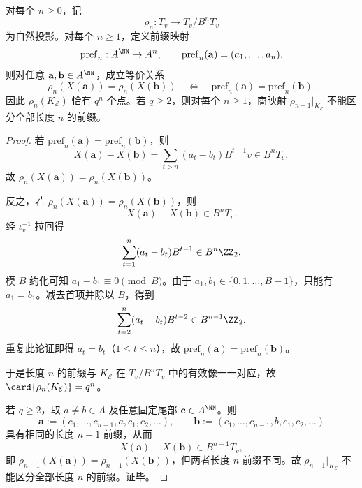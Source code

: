 \begin{proposition}\label{prop:killo-2adic-holographic-prefix-classification}
对每个 \(n\ge 0\)，记
\[
\rho_n:T_v\to T_v/B^nT_v
\]
为自然投影。对每个 \(n\ge 1\)，定义前缀映射
\[
\mathrm{pref}_n:A^\NN\to A^n,\qquad
\mathrm{pref}_n(\mathbf a)=(a_1,\dots,a_n),
\]
则对任意 \(\mathbf a,\mathbf b\in A^\NN\)，成立等价关系
\[
\rho_n(X(\mathbf a))=\rho_n(X(\mathbf b))
\quad\Longleftrightarrow\quad
\mathrm{pref}_n(\mathbf a)=\mathrm{pref}_n(\mathbf b).
\]
因此 \(\rho_n(K_{\mathcal E})\) 恰有 \(q^n\) 个点。若 \(q\ge 2\)，则对每个 \(n\ge 1\)，商映射 \(\rho_{n-1}|_{K_{\mathcal E}}\) 不能区分全部长度 \(n\) 的前缀。
\end{proposition}
\begin{proof}
若 \(\mathrm{pref}_n(\mathbf a)=\mathrm{pref}_n(\mathbf b)\)，则
\[
X(\mathbf a)-X(\mathbf b)=\sum_{t>n}(a_t-b_t)B^{t-1}v\in B^nT_v,
\]
故 \(\rho_n(X(\mathbf a))=\rho_n(X(\mathbf b))\)。

反之，若 \(\rho_n(X(\mathbf a))=\rho_n(X(\mathbf b))\)，则
\[
X(\mathbf a)-X(\mathbf b)\in B^nT_v.
\]
经 \(\iota_v^{-1}\) 拉回得
\[
\sum_{t=1}^{n}(a_t-b_t)B^{t-1}\in B^n\ZZ_2.
\]
模 \(B\) 约化可知 \(a_1-b_1\equiv 0\pmod B\)。由于 \(a_1,b_1\in\{0,1,\dots,B-1\}\)，只能有 \(a_1=b_1\)。减去首项并除以 \(B\)，得到
\[
\sum_{t=2}^{n}(a_t-b_t)B^{t-2}\in B^{n-1}\ZZ_2.
\]
重复此论证即得 \(a_t=b_t\)（\(1\le t\le n\)），故 \(\mathrm{pref}_n(\mathbf a)=\mathrm{pref}_n(\mathbf b)\)。

于是长度 \(n\) 的前缀与 \(K_{\mathcal E}\) 在 \(T_v/B^nT_v\) 中的有效像一一对应，故 \(\card{\rho_n(K_{\mathcal E})}=q^n\)。

若 \(q\ge 2\)，取 \(a\neq b\in A\) 及任意固定尾部 \(\mathbf c\in A^\NN\)。则
\[
\mathbf a:=(c_1,\dots,c_{n-1},a,c_1,c_2,\dots),\qquad
\mathbf b:=(c_1,\dots,c_{n-1},b,c_1,c_2,\dots)
\]
具有相同的长度 \(n-1\) 前缀，从而
\[
X(\mathbf a)-X(\mathbf b)\in B^{n-1}T_v,
\]
即 \(\rho_{n-1}(X(\mathbf a))=\rho_{n-1}(X(\mathbf b))\)，但两者长度 \(n\) 前缀不同。故 \(\rho_{n-1}|_{K_{\mathcal E}}\) 不能区分全部长度 \(n\) 的前缀。证毕。
\end{proof}

